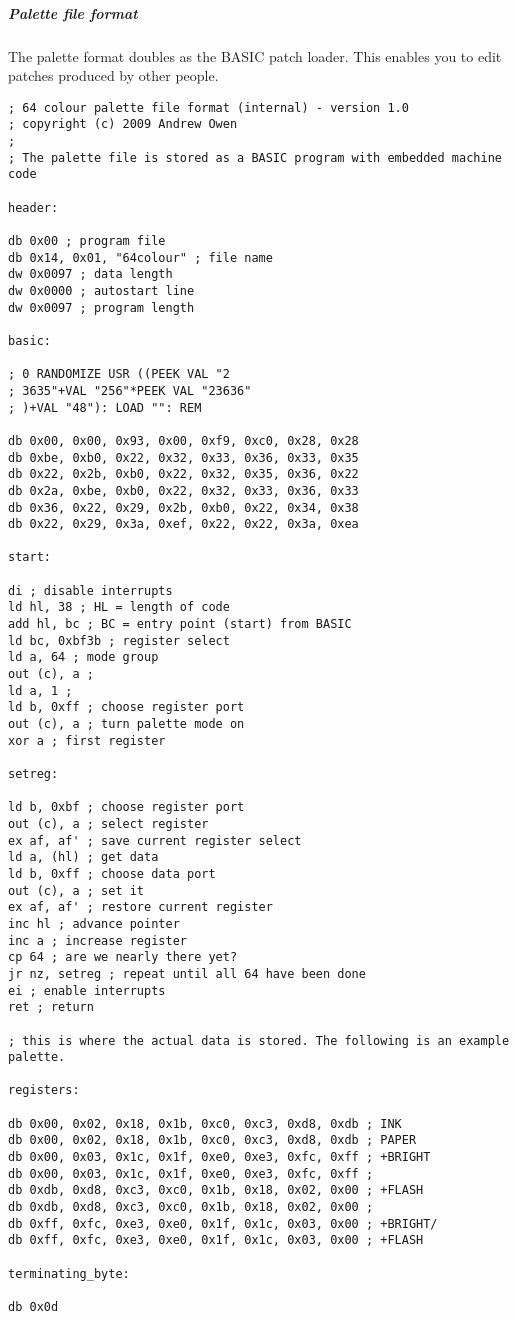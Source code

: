 \subparagraph{Palette file format}
The palette format doubles as the BASIC patch loader. This enables you
to edit patches produced by other people.
\begin{verbatim}
; 64 colour palette file format (internal) - version 1.0
; copyright (c) 2009 Andrew Owen
;
; The palette file is stored as a BASIC program with embedded machine code

header:

db 0x00 ; program file
db 0x14, 0x01, "64colour" ; file name
dw 0x0097 ; data length
dw 0x0000 ; autostart line
dw 0x0097 ; program length

basic:

; 0 RANDOMIZE USR ((PEEK VAL "2
; 3635"+VAL "256"*PEEK VAL "23636"
; )+VAL "48"): LOAD "": REM

db 0x00, 0x00, 0x93, 0x00, 0xf9, 0xc0, 0x28, 0x28
db 0xbe, 0xb0, 0x22, 0x32, 0x33, 0x36, 0x33, 0x35
db 0x22, 0x2b, 0xb0, 0x22, 0x32, 0x35, 0x36, 0x22
db 0x2a, 0xbe, 0xb0, 0x22, 0x32, 0x33, 0x36, 0x33
db 0x36, 0x22, 0x29, 0x2b, 0xb0, 0x22, 0x34, 0x38
db 0x22, 0x29, 0x3a, 0xef, 0x22, 0x22, 0x3a, 0xea

start:

di ; disable interrupts
ld hl, 38 ; HL = length of code
add hl, bc ; BC = entry point (start) from BASIC
ld bc, 0xbf3b ; register select
ld a, 64 ; mode group
out (c), a ;
ld a, 1 ;
ld b, 0xff ; choose register port
out (c), a ; turn palette mode on
xor a ; first register

setreg:

ld b, 0xbf ; choose register port
out (c), a ; select register
ex af, af' ; save current register select
ld a, (hl) ; get data
ld b, 0xff ; choose data port
out (c), a ; set it
ex af, af' ; restore current register
inc hl ; advance pointer
inc a ; increase register
cp 64 ; are we nearly there yet?
jr nz, setreg ; repeat until all 64 have been done
ei ; enable interrupts
ret ; return

; this is where the actual data is stored. The following is an example palette.

registers:

db 0x00, 0x02, 0x18, 0x1b, 0xc0, 0xc3, 0xd8, 0xdb ; INK
db 0x00, 0x02, 0x18, 0x1b, 0xc0, 0xc3, 0xd8, 0xdb ; PAPER
db 0x00, 0x03, 0x1c, 0x1f, 0xe0, 0xe3, 0xfc, 0xff ; +BRIGHT
db 0x00, 0x03, 0x1c, 0x1f, 0xe0, 0xe3, 0xfc, 0xff ;
db 0xdb, 0xd8, 0xc3, 0xc0, 0x1b, 0x18, 0x02, 0x00 ; +FLASH
db 0xdb, 0xd8, 0xc3, 0xc0, 0x1b, 0x18, 0x02, 0x00 ;
db 0xff, 0xfc, 0xe3, 0xe0, 0x1f, 0x1c, 0x03, 0x00 ; +BRIGHT/
db 0xff, 0xfc, 0xe3, 0xe0, 0x1f, 0x1c, 0x03, 0x00 ; +FLASH

terminating_byte:

db 0x0d 
\end{verbatim}

